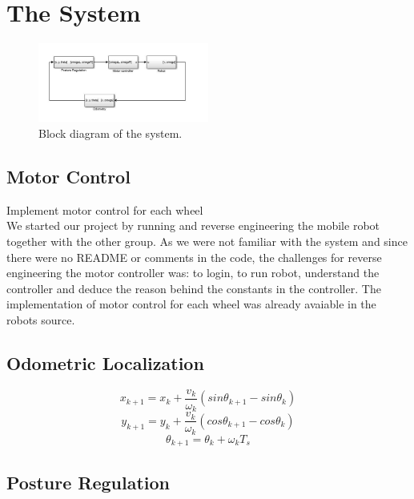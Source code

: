 \documentclass[a4paper,10pt]{article}
\begin{document}
\section*{The System}
	\begin{figure}[H]
	\centering
	\includegraphics[width=0.5\textwidth]{blokkskjema}
	\caption{Block diagram of the system.}	
 	\label{fig:2}
	\end{figure}

\subsection*{Motor Control}
	Implement motor control for each wheel \\
		We started our project by running and reverse engineering the mobile robot together with the other group. 
		As we were not familiar with the system and since there were no README or comments in the code, the challenges for reverse engineering the motor controller was: 
		to login, to run robot, understand the controller and deduce the reason behind the constants in the controller.
		The implementation of motor control for each wheel was already avaiable in the robots source. 

\subsection*{Odometric Localization}
		
		\begin{equation}
		x_{k+1}=x_k+\frac{v_k}{\omega_k}(sin\theta_{k+1}-sin\theta_k)
		\end{equation}
		\begin{equation}
		y_{k+1}=y_k+\frac{v_k}{\omega_k}(cos\theta_{k+1}-cos\theta_k)
		\end{equation}
		\begin{equation}
		\theta_{k+1}=\theta_k+\omega_kT_s
		\end{equation}
		
\subsection*{Posture Regulation}
\end{document}
